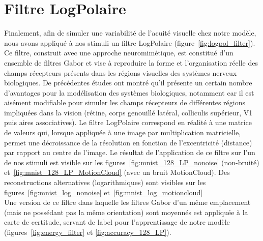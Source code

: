 \section{Filtre LogPolaire}
Finalement, afin de simuler une variabilité de l'acuité visuelle chez notre modèle, nous avons appliqué à nos stimuli un filtre LogPolaire (figure~\ref{fig:logpol_filter}).
Ce filtre, construit avec une approche neuromimétique, est constitué d'un ensemble de filtres Gabor et vise à reproduire la forme et l'organisation réelle des champs récepteurs présents dans les régions visuelles des systèmes nerveux biologiques. 
De précédentes études ont montré qu'il présente un certain nombre d'avantages pour la modélisation des systèmes biologiques, notamment car il est aisément modifiable pour simuler les champs récepteurs de différentes régions impliquées dans la vision (rétine, corps genouillé latéral, colliculis supérieur, V1 puis aires associatives).
Le filtre LogPolaire correspond en réalité à une matrice de valeurs qui, lorsque appliquée à une image par multiplication matricielle, permet une décroissance de la résolution en fonction de l'excentricité (distance) par rapport au centre de l'image. 
Le résultat de l'application de ce filtre sur l'un de nos stimuli est visible sur les figures~\ref{fig:mnist_128_LP_nonoise} (non-bruité) et~\ref{fig:mnist_128_LP_MotionCloud} (avec un bruit MotionCloud). Des reconstructions alternatives (logarithmiques) sont visibles sur les figures~\ref{fig:mnist_log_nonoise} et~\ref{fig:mnist_log_motioncloud} \autocite{Freeman2011} \\
Une version de ce filtre dans laquelle les filtres Gabor d'un même emplacement (mais ne possédant pas la même orientation) sont moyennés est appliquée à la carte de certitude, servant de label pour l'apprentissage de notre modèle (figures~\ref{fig:energy_filter} et \ref{fig:accuracy_128_LP}).

